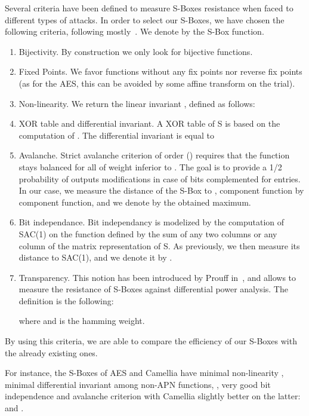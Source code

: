 \documentclass{article}\usepackage{amsthm}
\newcommand{\SBox}{S-Box\xspace}
\newcommand{\SBoxes}{S-Boxes\xspace}
\begin{document}
Several criteria have been defined to measure \SBoxes resistance when faced to different types of attacks. In order to select our \SBoxes, we have chosen the following criteria, following mostly~\cite{Alvarez:2008:apn}. 
We denote by  the \SBox function.
\begin{enumerate}
\item Bijectivity. By construction we only look for bijective functions.
\item Fixed Points. We favor functions without any fix points nor reverse fix points (as for the AES, this can be avoided by some affine transform on the trial). 
\item Non-linearity. We return the linear invariant , defined as follows:  
						
\item XOR table and differential invariant.  A XOR table of S is based on the
  computation of . The differential invariant
   is equal to  
 






\item Avalanche. Strict avalanche criterion of order  () requires
  that the function  stays balanced for all
   of weight inferior to . The goal is to provide a
  1/2 probability of outputs modifications in case of  bits complemented for
  entries.  
 In our case, we measure the distance of the \SBox to , component
 function by component function, and we denote by  the obtained maximum.


\item Bit independance. Bit independancy is modelized by the computation of
  SAC(1) on the function defined by the sum of any two columns or any column of
  the matrix representation of S. As previously, we then measure its distance to
  SAC(1), and we denote it by .  


\item Transparency. This notion has been introduced by Prouff in~\cite{Prouff:2005:transparency}, and allows to measure the resistance of \SBoxes against differential power analysis. 
The definition is the following: 

 where  and  is the hamming weight.
\end{enumerate}

By using this criteria, we are able to compare the efficiency of our \SBoxes with the already existing ones.

For instance, the \SBoxes of AES and Camellia have minimal non-linearity , minimal
differential invariant among non-APN functions,
, very good bit independence
 and avalanche criterion with Camellia slightly better
on the latter:  and .
\end{document}
